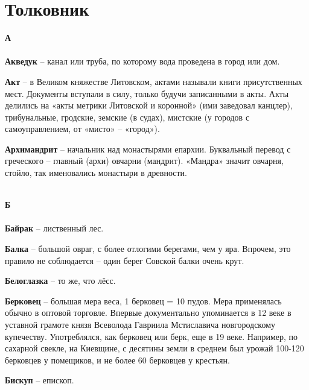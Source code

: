 \chapter{Толковник}

\begin{multicols}{2}
\setlength{\columnsep}{1.5cm}
\setlength{\columnseprule}{0.2pt}


\textbf{А\\}
\mbox{ }\\

\textbf{Акведук} – канал или труба, по которому вода проведена в город или дом.

\textbf{Акт} – в Великом княжестве Литовском, актами называли книги присутственных мест. Документы вступали в силу, только будучи записанными в акты. Акты делились на «акты метрики Литовской и коронной» (ими заведовал канцлер), трибунальные, гродские, земские (в судах), мистские (у городов с самоуправлением, от «мисто» – «город»).

\textbf{Архимандрит} – начальник над монастырями епархии. Буквальный перевод с греческого – главный (архи) овчарни (мандрит). «Мандра» значит овчарня, стойло, так именовались монастыри в древности.

\mbox{ }\\
\textbf{Б\\}
\mbox{ }\\

\noindent\textbf{Байрак} – лиственный лес.

\textbf{Балка} – большой овраг, с более отлогими берегами, чем у яра. Впрочем, это правило не соблюдается – один берег Совской балки очень крут. 

\textbf{Белоглазка} – то же, что лёсс. 

\textbf{Берковец} – большая мера веса, 1 берковец = 10 пудов. Мера применялась обычно в оптовой торговле. Впервые документально упоминается в 12 веке в уставной грамоте князя Всеволода Гавриила Мстиславича новгородскому купечеству. Употреблялся, как берковец или берк, еще в 19 веке. Например, по сахарной свекле, на Киевщине, с десятины земли в среднем был урожай 100-120 берковцев у помещиков, и не более 60 берковцев у крестьян. 


\textbf{Бискуп} – епископ.


\end{multicols}
